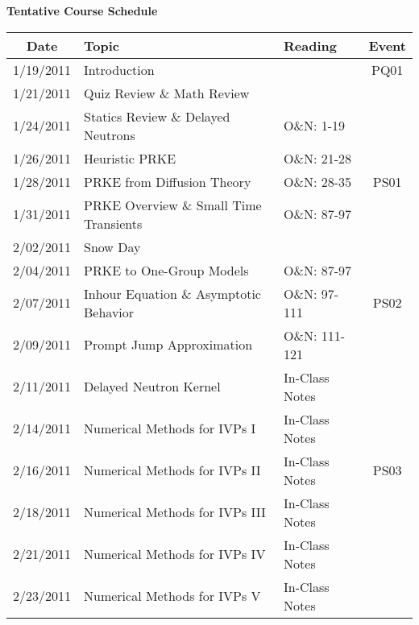 
\renewcommand{\DocTitle}{Tentative Course Schedule}
\noprintanswers


\begin{center}
\textbf{\DocTitle}
\end{center}

{
\begin{center}
\setlength{\extrarowheight}{1.5pt}
\begin{longtable}{cllc}
Date&	Topic&	Reading	&Event\\ \hline\hline
\endhead
1/19/2011 & Introduction 							&				& PQ01 	\\
1/21/2011 &	Quiz Review \& Math Review 				& 			 	& 		\\ \hline
1/24/2011 &	Statics Review \& Delayed Neutrons 		& O\&N: 1-19	& 		\\
1/26/2011 & Heuristic PRKE							& O\&N: 21-28 	& 		\\
1/28/2011 &	PRKE from Diffusion Theory 				& O\&N: 28-35 	& PS01 	\\ \hline
1/31/2011 &	PRKE Overview \& Small Time Transients  & O\&N: 87-97	& 		\\
2/02/2011 &	Snow Day							 	& 				&		\\
2/04/2011 &	PRKE to One-Group Models				& O\&N: 87-97	&		\\ \hline
2/07/2011 &	Inhour Equation \& Asymptotic Behavior  & O\&N: 97-111	& PS02	\\
2/09/2011 &	Prompt Jump Approximation				& O\&N: 111-121	& 		\\ 
2/11/2011 &	Delayed Neutron Kernel					& In-Class Notes& 		\\ \hline
2/14/2011 &	Numerical Methods for IVPs I			& In-Class Notes&  		\\ 
2/16/2011 &	Numerical Methods for IVPs II			& In-Class Notes& PS03	\\
2/18/2011 &	Numerical Methods for IVPs III			& In-Class Notes& 		\\ \hline
2/21/2011 & Numerical Methods for IVPs IV			& In-Class Notes& 		\\
2/23/2011 &	Numerical Methods for IVPs V 			& In-Class Notes& 		\\ 

\end{longtable}
\end{center}}
